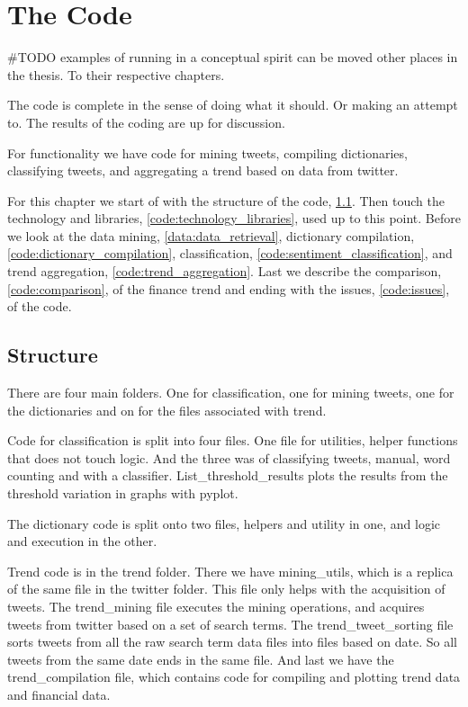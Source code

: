 \chapter{The Code}\label{code}

#TODO examples of running in a conceptual spirit can be moved other places in the
thesis. To their respective chapters. 

The code is complete in the sense of doing what it should. Or making an attempt
to. The results of the coding are up for discussion.

For functionality we have code for mining tweets, compiling dictionaries,
classifying tweets, and aggregating a trend based on data from twitter.  

For this chapter we start of with the structure of the code,
\ref{code:structure}. Then touch the technology and libraries,
\ref{code:technology_libraries}, used up to this point. Before we look at the
data mining, \ref{data:data_retrieval}, dictionary compilation,
\ref{code:dictionary_compilation}, classification,
\ref{code:sentiment_classification}, and trend aggregation,
\ref{code:trend_aggregation}. Last we describe the comparison,
\ref{code:comparison}, of the finance trend and ending with the issues,
\ref{code:issues}, of the code.  

\section{Structure}\label{code:structure}
There are four main folders. One for classification, one for mining tweets, one
for the dictionaries and on for the files associated with trend. 

Code for classification is split into four files. One file for utilities,
helper functions that does not touch logic. And the three was of classifying
tweets, manual, word counting and with a classifier. List\_threshold\_results
plots the results from the threshold variation in graphs with pyplot. 

The dictionary code is split onto two files, helpers and utility in one, and
logic and execution in the other. 

Trend code is in the trend folder. There we have mining\_utils, which is a
replica of the same file in the twitter folder. This file only helps with the
acquisition of tweets. The trend\_mining file executes the mining operations,
and acquires tweets from twitter based on a set of search terms. The
trend\_tweet\_sorting file sorts tweets from all the raw search term data files
into files based on date. So all tweets from the same date ends in the same
file. And last we have the trend\_compilation file, which contains code for
compiling and plotting trend data and financial data.  

